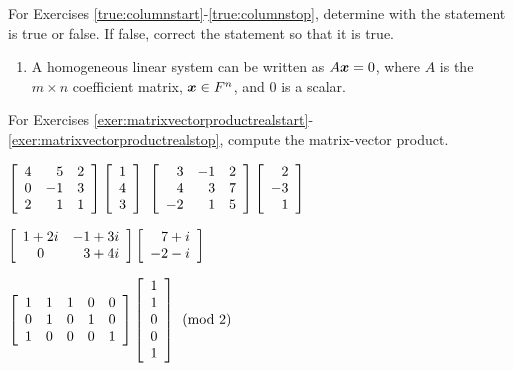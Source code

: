 
\noindent For Exercises \ref{true:columnstart}-\ref{true:columnstop}, determine with the statement is true or false. If false, correct the statement so that it is true.
\begin{enumerate}[!HW!, start=1]
\item\label{true:columnstart}\label{true:columnstop} A homogeneous linear system can be written as $A\bb x = 0$, where $A$ is the $m\times n$ coefficient matrix, $\bb x\in F^n$, and $0$ is a scalar. %
\end{enumerate}

\noindent For Exercises \ref{exer:matrixvectorproductrealstart}-\ref{exer:matrixvectorproductrealstop}, compute the matrix-vector product. 
\begin{enumerate}[!HW!]
\begin{multicols}{2}
\item\label{exer:matrixvectorproductrealstart} $\mtx{rrr}{4&5&2\\0&-1&3\\2&1&1}\vr{1\\4\\3}$ %
\itemspade $\mtx{rrr}{3&-1&2\\4&3&7\\-2&1&5}\vr{2\\-3\\1}$
\end{multicols}
\end{enumerate}
\begin{enumerate}[!HW!, label=$\spadesuit$ \arabic*., ref=\arabic*]
\begin{multicols}{2}
\itemspade $\mtx{cr}{1+2i&-1+3i\\0&3+4i}\vr{7+i\\-2-i}$
\item\label{exer:matrixvectorproductrealstop} $\mtx{ccccc}{1&1&1&0&0\\0&1&0&1&0\\1&0&0&0&1}\vr{1\\1\\0\\0\\1}\pmod 2$
\end{multicols}
\end{enumerate}


